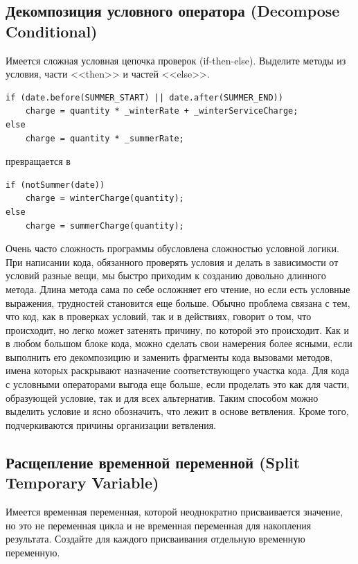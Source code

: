 \documentclass{../../text-style}
\begin{document}
\subsection{Декомпозиция условного оператора (Decompose Conditional)}

Имеется сложная условная цепочка проверок (if-then-else). Выделите методы из условия, части <<then>> и частей <<else>>.

\begin{verbatim}
if (date.before(SUMMER_START) || date.after(SUMMER_END))
    charge = quantity * _winterRate + _winterServiceCharge;
else
    charge = quantity * _summerRate;
\end{verbatim}

превращается в 

\begin{verbatim}
if (notSummer(date))
    charge = winterCharge(quantity);
else
    charge = summerCharge(quantity);
\end{verbatim}

Очень часто сложность программы обусловлена сложностью условной логики. При написании кода, обязанного проверять условия и делать в зависимости от условий разные вещи, мы быстро приходим к созданию довольно длинного метода. Длина метода сама по себе осложняет его чтение, но если есть условные выражения, трудностей становится еще больше. Обычно проблема связана с тем, что код, как в проверках условий, так и в действиях, говорит о том, что происходит, но легко может затенять причину, по которой это происходит. Как и в любом большом блоке кода, можно сделать свои намерения более ясными, если выполнить его декомпозицию и заменить фрагменты кода вызовами методов, имена которых раскрывают назначение соответствующего участка кода. Для кода с условными операторами выгода еще больше, если проделать это как для части, образующей условие, так и для всех альтернатив. Таким способом можно выделить условие и ясно обозначить, что лежит в основе ветвления. Кроме того, подчеркиваются причины организации ветвления.

\subsection{Расщепление временной переменной (Split Temporary Variable)}

Имеется временная переменная, которой неоднократно присваивается значение, но это не переменная цикла и не временная переменная для накопления результата. Создайте для каждого присваивания отдельную временную переменную.
\end{document}
